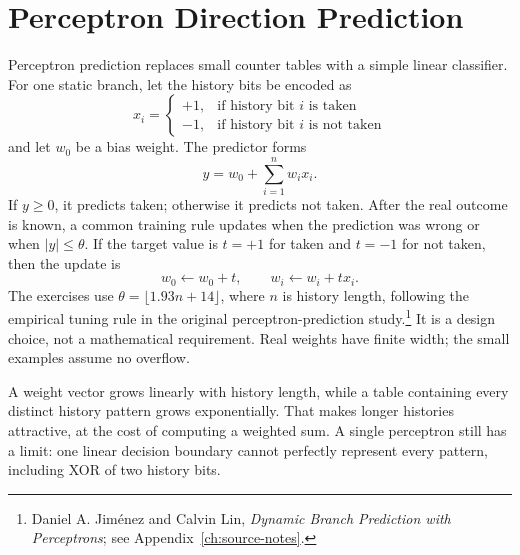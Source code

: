 \section{Perceptron Direction Prediction}\label{sec:auto-043b}
Perceptron prediction replaces small counter tables with a simple linear classifier.
For one static branch, let the history bits be encoded as
\begin{equation}\label{eq:pipe-perceptron-x}
    x_i=
    \begin{cases}
        +1, & \text{if history bit }i\text{ is taken}\\
        -1, & \text{if history bit }i\text{ is not taken}
    \end{cases}
\end{equation}
and let $w_0$ be a bias weight.
The predictor forms
\begin{equation}\label{eq:pipe-perceptron-y}
    y=w_0+\sum_{i=1}^{n} w_i x_i.
\end{equation}
If $y\ge 0$, it predicts taken; otherwise it predicts not taken.
After the real outcome is known, a common training rule updates when the prediction was wrong or when $|y|\le\theta$.
If the target value is $t=+1$ for taken and $t=-1$ for not taken, then the update is
\begin{equation}\label{eq:pipe-perceptron-update}
    w_0 \leftarrow w_0 + t,
    \qquad
    w_i \leftarrow w_i + t x_i.
\end{equation}
The exercises use $\theta=\lfloor 1.93n+14\rfloor$, where $n$ is history length, following the empirical tuning rule in the original perceptron-prediction study.\footnote{Daniel A. Jiménez and Calvin Lin, \emph{Dynamic Branch Prediction with Perceptrons}; see Appendix~\ref{ch:source-notes}.}
It is a design choice, not a mathematical requirement.
Real weights have finite width; the small examples assume no overflow.

A weight vector grows linearly with history length, while a table containing every distinct history pattern grows exponentially.
That makes longer histories attractive, at the cost of computing a weighted sum.
A single perceptron still has a limit: one linear decision boundary cannot perfectly represent every pattern, including XOR of two history bits.

